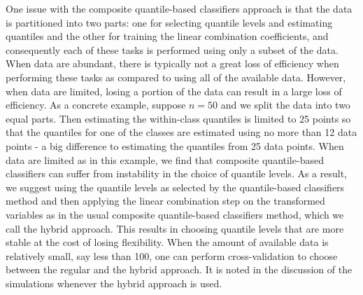 One issue with the composite quantile-based classifiers approach is that the
data is partitioned into two parts: one for selecting quantile levels and
estimating quantiles and the other for training the linear combination
coefficients, and consequently each of these tasks is performed using only a
subset of the data.  When data are abundant, there is typically not a great loss
of efficiency when performing these tasks as compared to using all of the
available data.  However, when data are limited, losing a portion of the data
can result in a large loss of efficiency.  As a concrete example, suppose
$n = 50$ and we split the data into two equal parts.  Then estimating the
within-class quantiles is limited to 25 points so that the quantiles for one of
the classes are estimated using no more than 12 data points - a big difference
to estimating the quantiles from 25 data points.  When data are limited as in
this example, we find that composite quantile-based classifiers can suffer from
instability in the choice of quantile levels.  As a result, we suggest using the
quantile levels as selected by the quantile-based classifiers method and then
applying the linear combination step on the transformed variables as in the
usual composite quantile-based classifiers method, which we call the hybrid
approach.  This results in choosing quantile levels that are more stable at the
cost of losing flexibility.  When the amount of available data is relatively
small, say less than 100, one can perform cross-validation to choose between the
regular and the hybrid approach.  It is noted in the discussion of the
simulations whenever the hybrid approach is used.




